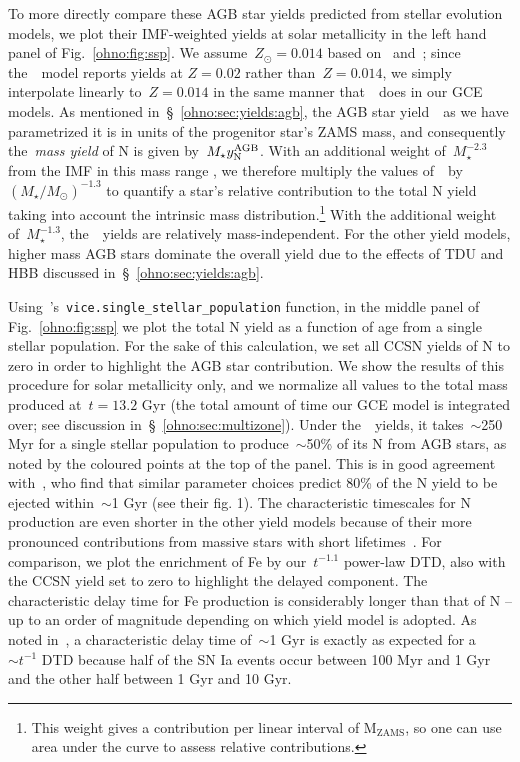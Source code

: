 To more directly compare these AGB star yields predicted from stellar
evolution models, we plot their IMF-weighted yields at solar metallicity in the
left hand panel of Fig.~\ref{ohno:fig:ssp}.
We assume~$Z_\odot = 0.014$ based on~\citet{Asplund2009}
and~\citet*{Asplund2021}; since the~\karakasten~model reports yields at
$Z = 0.02$ rather than~$Z = 0.014$, we simply interpolate linearly
to~$Z = 0.014$ in the same manner that~\vice~does in our GCE models.
As mentioned in~\S~\ref{ohno:sec:yields:agb}, the AGB star yield~~as we
have parametrized it is in units of the progenitor star's ZAMS mass, and
consequently the~\textit{mass yield} of N is given by~$M_\star y_\text{N}^\text{AGB}$.
With an additional weight of~$M_\star^{-2.3}$ from the IMF in this mass range
\citep[e.g.][]{Kroupa2001}, we therefore multiply the values of~~by
$(M_\star / M_\odot)^{-1.3}$ to quantify a star's relative contribution to the
total N yield taking into account the intrinsic mass distribution.\footnote{
	This weight gives a contribution per linear interval of M$_\text{ZAMS}$, so
	one can use area under the curve to assess relative contributions.
}
With the additional weight of~$M_\star^{-1.3}$, the~\cristallo~yields are
relatively mass-independent.
For the other yield models, higher mass AGB stars dominate the overall yield
due to the effects of TDU and HBB discussed in~\S~\ref{ohno:sec:yields:agb}.
\par
Using~\vice's~\texttt{vice.single\_stellar\_population} function, in the
middle panel of Fig.~\ref{ohno:fig:ssp} we plot the total N yield as a function of
age from a single stellar population.
For the sake of this calculation, we set all CCSN yields of N to zero in order
to highlight the AGB star contribution.
We show the results of this procedure for solar metallicity only, and we
normalize all values
to the total mass produced at~$t = 13.2$ Gyr (the total amount of time our GCE
model is integrated over; see discussion in~\S~\ref{ohno:sec:multizone}).
Under the~\cristallo~yields, it takes~$\sim$250 Myr for a single stellar
population to produce~$\sim$50\% of its N from AGB stars, as noted by the
coloured points at the top of the panel.
This is in good agreement with~\citet{Maiolino2019}, who find that similar
parameter choices predict 80\% of the N yield to be ejected within~$\sim$1 Gyr
(see their fig. 1).
The characteristic timescales for N production are even shorter in the other
yield models because of their more pronounced contributions from massive stars
with short lifetimes~\citep[e.g.][]{Larson1974, Maeder1989, Padovani1993}.
For comparison, we plot the enrichment of Fe by our~$t^{-1.1}$ power-law DTD,
also with the CCSN yield set to zero to highlight the delayed component.
The characteristic delay time for Fe production is considerably longer than
that of N -- up to an order of magnitude depending on which yield model is
adopted.
As noted in~\citet{Johnson2021}, a characteristic delay time of~$\sim$1 Gyr
is exactly as expected for a~$\sim t^{-1}$ DTD because half of the SN Ia
events occur between 100 Myr and 1 Gyr and the other half between 1 Gyr and
10 Gyr.

